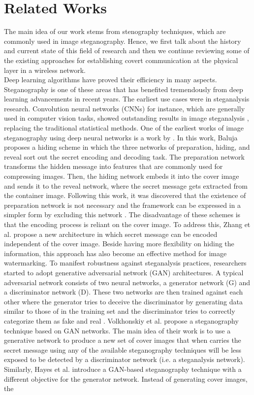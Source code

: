 \section{Related Works}
\label{s:related}
The main idea of our work stems from stenography techniques, which are commonly used in image steganography. Hence, we first talk about the history and current state of this field of research and then we continue reviewing some of the existing approaches for establishing covert communication at the physical layer in a wireless network.\\
Deep learning algorithms have proved their efficiency in many aspects. Steganography is one of these areas that has benefited tremendously from deep learning advancements in recent years. The earliest use cases were in steganalysis research. Convolution neural networks (CNNs) for instance, which are generally used in computer vision tasks, showed outstanding results in image steganalysis \cite{tan2014stacked,qian2015deep,xu2016structural}, replacing the traditional statistical methods. One of the earliest works of image steganography using deep neural networks is a work by \cite{baluja2017hiding}. In this work, Baluja proposes a hiding scheme in which the three networks of preparation, hiding, and reveal sort out the secret encoding and decoding task. The preparation network transforms the hidden message into features that are commonly used for compressing images. Then, the hiding network embeds it into the cover image and sends it to the reveal network, where the secret message gets extracted from the container image. Following this work, it was discovered that the existence of preparation network is not necessary and the framework can be expressed in a simpler form by excluding this network \cite{zhang2021brief}. The disadvantage of these schemes is that the encoding process is reliant on the cover image. To address this, Zhang et al. \cite{zhang2020udh} propose a new architecture in which secret message can be encoded independent of the cover image. Beside having more flexibility on hiding the information, this approach has also become an effective method for image watermarking. To manifest robustness against steganalysis practices, researchers started to adopt generative adversarial network (GAN) architectures. A typical adversarial network consists of two neural networks, a generator network (G) and a discriminator network (D). These two networks are then trained against each other where the generator tries to deceive the discriminator by generating data similar to those of in the training set and the discriminator tries to correctly categorize them as fake and real \cite{goodfellow2014generative}. Volkhonskiy et al. \cite{volkhonskiy2020steganographic} propose a steganography technique based on GAN networks. The main idea of their work is to use a generative network to produce a new set of cover images that when carries the secret message using any of the available steganography techniques will be less exposed to be detected by a discriminator network (i.e. a steganalysis network). Similarly, Hayes et al. \cite{hayes2017generating} introduce a GAN-based steganography technique with a different objective for the generator network. Instead of generating cover images, the 